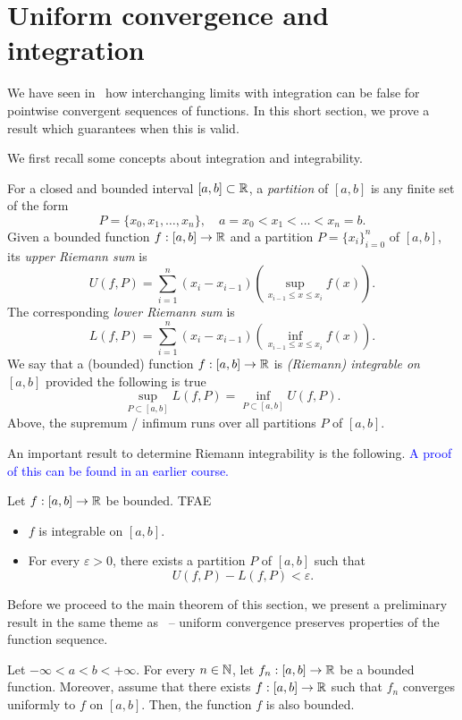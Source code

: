 \section{Uniform convergence and integration}
\label{sec:unif_int}
We have seen in~ how interchanging limits with integration can be false for pointwise convergent sequences of functions. In this short section, we prove a result which guarantees when this is valid.

We first recall some concepts about integration and integrability.
\begin{defn}
	\label{defn:riemann}
	For a closed and bounded interval $[a,b]\subset\mathbb{R}$, a \textit{partition} of $[a,b]$ is any finite set of the form
	\[
	P = \{x_0,x_1,\dots, x_n\},\quad a = x_0 < x_1 < \dots < x_n = b.
	\]
	Given a bounded function $f:[a,b]\to \mathbb{R}$ and a partition $P = \{x_i\}_{i=0}^n$ of $[a,b]$, its \textit{upper Riemann sum} is
	\[
	U(f,P) = \sum_{i=1}^n (x_i-x_{i-1})\left(\sup_{x_{i-1}\le x \le x_i}f(x)\right).
	\]
	The corresponding \textit{lower Riemann sum} is
	\[
	L(f,P) = \sum_{i=1}^n (x_i-x_{i-1})\left(\inf_{x_{i-1}\le x \le x_i}f(x)\right).
	\]
	We say that a (bounded) function $f:[a,b]\to \mathbb{R}$ is \textit{(Riemann) integrable on $[a,b]$} provided the following is true
	\[
	\sup_{P\subset [a,b]}L(f,P) = \inf_{P\subset [a,b]}U(f,P).
	\]
	Above, the supremum / infimum runs over all partitions $P$ of $[a,b]$.
\end{defn}
An important result to determine Riemann integrability is the following. \textcolor{blue}{A proof of this can be found in an earlier course.}
\begin{thm}
	\label{thm:cauchy_int}
	Let $f:[a,b]\to\mathbb{R}$ be bounded. TFAE
	\begin{itemize}
		\item $f$ is integrable on $[a,b]$.
		\item For every $\varepsilon>0$, there exists a partition $P$ of $[a,b]$ such that
		\[
		U(f,P) - L(f,P)<\varepsilon.
		\]
	\end{itemize}
\end{thm}
Before we proceed to the main theorem of this section, we present a preliminary result in the same theme as~ -- uniform convergence preserves properties of the function sequence.
\begin{prop}
	Let $-\infty < a < b < +\infty$. For every $n\in\mathbb{N}$, let $f_n:[a,b]\to\mathbb{R}$ be a bounded function. Moreover, assume that there exists $f:[a,b]\to\mathbb{R}$ such that $f_n$ converges uniformly to $f$ on $[a,b]$. Then, the function $f$ is also bounded.
\end{prop}
